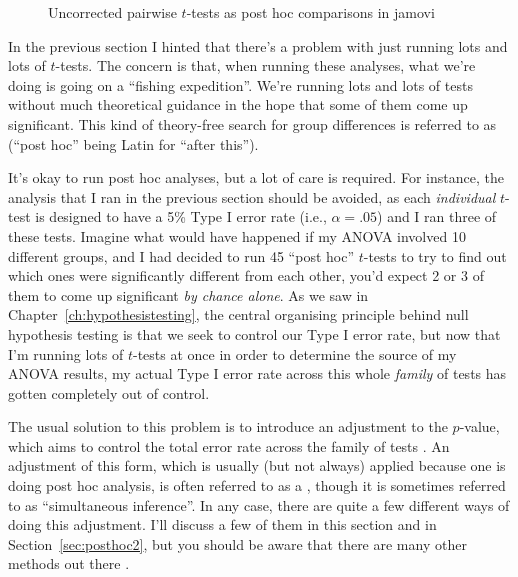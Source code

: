 \begin{figure}[htb]
\begin{center}
\caption{Uncorrected pairwise $t$-tests as post hoc comparisons in jamovi}
\HR
\label{fig:anova3}
\end{center}
\end{figure}


In the previous section I hinted that there's a problem with just running lots and lots of $t$-tests. The concern is that, when running these analyses, what we're doing is going on a ``fishing expedition''. We're running lots and lots of tests without much theoretical guidance in the hope that some of them come up significant. This kind of theory-free search for group differences is referred to as  (``post hoc'' being Latin for ``after this'').   

It's okay to run post hoc analyses, but a lot of care is required. For instance, the analysis that I ran in the previous section should be avoided, as each {\it individual} $t$-test is designed to have a 5\% Type I error rate (i.e., $\alpha = .05$) and I ran three of these tests. Imagine what would have happened if my ANOVA involved 10 different groups, and I had decided to run 45 ``post hoc'' $t$-tests to try to find out which ones were significantly different from each other, you'd expect 2 or 3 of them to come up significant {\it by chance alone}. As we saw in Chapter~\ref{ch:hypothesistesting}, the central organising principle behind null hypothesis testing is that we seek to control our Type I error rate, but now that I'm running lots of $t$-tests at once in order to determine the source of my ANOVA results, my actual Type I error rate across this whole {\it family} of tests has gotten completely out of control. 

The usual solution to this problem is to introduce an adjustment to the $p$-value, which aims to control the total error rate across the family of tests \parencite[see][]{Shaffer1995}. An adjustment of this form, which is usually (but not always) applied because one is doing post hoc analysis, is often referred to as a , though it is sometimes referred to as ``simultaneous inference''. In any case, there are quite a few different ways of doing this adjustment. I'll discuss a few of them in this section and in Section~\ref{sec:posthoc2}, but you should be aware that there are many other methods out there \parencite[see, e.g.,][]{Hsu1996}. 

